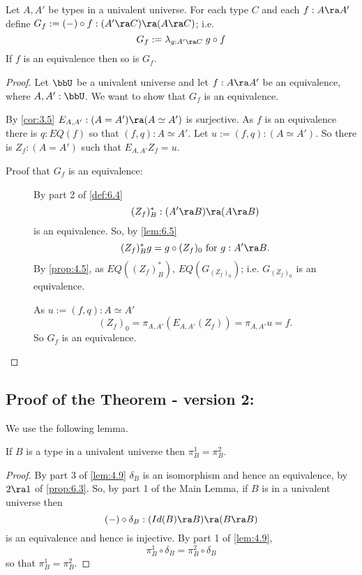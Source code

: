 \begin{lem}\label{fe:lem-main2}\label{lem:6.6}
Let $A,A'$ be types in a univalent universe.  For each type $C$ and each
$f:A\ra A'$ define
$G_f := (-)\circ f:(A'\ra C)\ra (A\ra C)$;
i.e.
  \[ G_f := \lambda_{g:A'\ra C}\; g\circ f\]
 If $f$ is an equivalence then so is $G_f$.
\end{lem}
\begin{proof} Let $\bbU$ be a univalent universe and let $f:A\ra A'$ be an 
equivalence, where $A,A':\bbU$.  We want to show that $G_f$ is an equivalence.

By \autoref{cor:3.5} $E_{A,A'}:(A=A')\ra (A\simeq A')$ is surjective.  
As $f$ is an equivalence there is $q:EQ(f)$ so that $(f,q):A\simeq A'$. Let $u:=(f,q):(A\simeq A')$.  So there is $Z_f:(A=A')$ such that $E_{A,A'}Z_f = u$.

\begin{description}
\item[Proof that $G_f$ is an equivalence:]
By part 2 of \autoref{def:6.4} 
  \[ (Z_f)_B^*:(A'\ra B)\ra (A\ra B)\]
is an equivalence.  So, by \autoref{lem:6.5}
  \[(Z_f)_B^*g = g\circ (Z_f)_0\mbox{ for } g:A'\ra B.\]
By \autoref{prop:4.5}, as $EQ((Z_f)_B^*)$, $EQ(G_{(Z_f)_0})$; i.e. $G_{(Z_f)_0}$ is an equivalence.

As $u:=(f,q):A\simeq A'$
  \[(Z_f)_0 = \pi_{A,A'}(E_{A,A'}(Z_f)) =\pi_{A,A'}u = f.\]
So $G_f$ is an equivalence.
\end{description}
\end{proof}

\subsection{Proof of the Theorem - version 2: } 

We use the following lemma.
\begin{lem}\label{fe:lem-projs}\label{lem:6.7}
If $B$ is a type in a univalent universe then $\pi^1_B = \pi^2_B$.
\end{lem}
\begin{proof} By part 3 of \autoref{lem:4.9} $\delta_B$ is an isomorphism and hence an equivalence, by $2\ra 1$ of \autoref{prop:6.3}.  So, by part 1 of the Main Lemma, if $B$ is in a univalent universe then
  \[ (-)\circ\delta_B : (Id(B)\ra B)\ra (B\ra B)\]
is an equivalence and hence is injective.  By part 1 of \autoref{lem:4.9},
  \[ \pi^1_B\circ\delta_B = \pi^2_B\circ\delta_B\]
so that $\pi^1_B=\pi^2_B$.
\end{proof}


